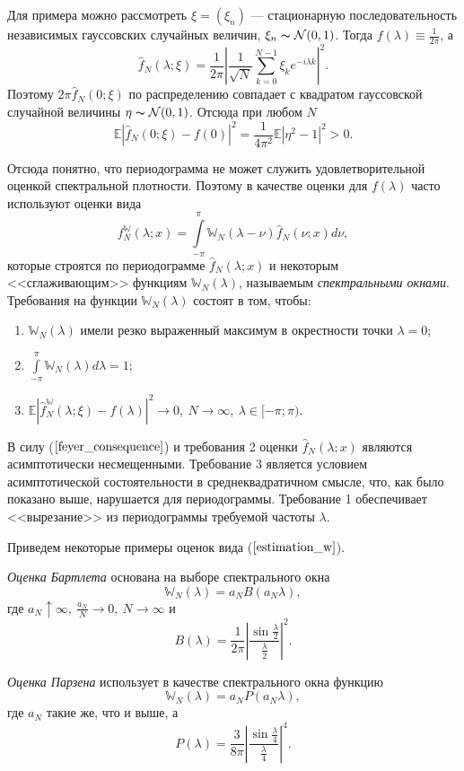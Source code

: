 Для примера можно рассмотреть $\xi = (\xi_n)$ --- стационарную последовательность независимых гауссовских случайных величин, $\xi_n \thicksim \mathcal{N} (0,1)$. Тогда $f(\lambda) \equiv \frac{1}{2\pi}$, а
\[\hat{f}_N(\lambda; \xi) = \frac{1}{2\pi} \left|\frac{1}{\sqrt{N}}\sum\limits_{k=0}^{N-1}{\xi_k e^{-i \lambda k}}\right|^2.\]
Поэтому $2\pi \hat{f}_N(0; \xi)$ по распределению совпадает с квадратом гауссовской случайной величины $\eta \thicksim \mathcal{N} (0,1)$. Отсюда при любом $N$
\[\mathbb{E} |\hat{f}_N(0; \xi) - f(0)|^2 = \frac{1}{4\pi^2} \mathbb{E} |\eta^2 - 1|^2 > 0.\]

Отсюда понятно, что периодограмма не может служить удовлетворительной оценкой спектральной плотности. Поэтому в качестве оценки для $f(\lambda)$ часто используют оценки вида
\begin{equation}
	f_N^{\mathds{W}}(\lambda; x) = \int\limits_{-\pi}^{\pi}{\mathds{W}_N(\lambda - \nu)\hat{f}_N(\nu; x) d\nu},
	\label{estimation_w}
\end{equation}
которые строятся по периодограмме $\hat{f}_N(\lambda; x)$ и некоторым <<сглаживающим>> функциям $\mathds{W}_N(\lambda)$, называемым \textit{спектральными окнами}.
Требования на функции $\mathds{W}_N(\lambda)$ состоят в том, чтобы:
\begin{enumerate}
	\item $\mathds{W}_N(\lambda)$ имели резко выраженный максимум в окрестности точки $\lambda = 0;$
	\item $\int\limits_{-\pi}^{\pi}{\mathds{W}_N(\lambda)d\lambda} = 1;$
	\item $\mathbb{E} |\hat{f}_N^\mathds{W}(\lambda; \xi) - f(\lambda)|^2 \to 0,~ N \to \infty,~ \lambda \in [-\pi;\pi).$
\end{enumerate}
В силу ($\ref{feyer_consequence}$) и требования 2 оценки $\hat{f}_N(\lambda; x)$ являются асимптотически несмещенными. Требование 3 является условием асимптотической состоятельности в среднеквадратичном смысле, что, как было показано выше, нарушается для периодограммы. Требование 1 обеспечивает <<вырезание>> из периодограммы требуемой частоты $\lambda$.

Приведем некоторые примеры оценок вида ($\ref{estimation_w}$).

\textit{Оценка Бартлета} основана на выборе спектрального окна
\[\mathds{W}_N(\lambda) = a_N B(a_N \lambda),\]
где $a_N \uparrow \infty,~ \frac{a_N}{N} \to 0,~ N \to \infty$ и
\[B(\lambda) = \frac{1}{2\pi}\left|\frac{\sin{\frac{\lambda}{2}}}{\frac{\lambda}{2}}\right|^2.\]

\textit{Оценка Парзена} использует в качестве спектрального окна функцию
\[\mathds{W}_N(\lambda) = a_N P(a_N \lambda),\]
где $a_N$ такие же, что и выше, а
\[P(\lambda) = \frac{3}{8\pi}\left|\frac{\sin{\frac{\lambda}{4}}}{\frac{\lambda}{4}}\right|^4.\]

